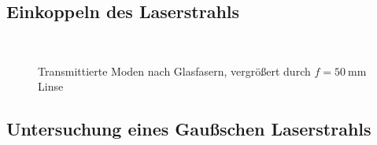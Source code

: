 \documentclass[11pt,a4paper,oneside]{scrartcl}
\begin{document}
\subsection{Einkoppeln des Laserstrahls}
\begin{figure}[H]
    \centering
  \\
   \caption{Transmittierte Moden nach Glasfasern, vergrößert durch $f=50\ \mathrm{mm}$ Linse}
    \label{FotostreckeGlasfasern}
\end{figure}
\subsection{Untersuchung eines Gaußschen Laserstrahls}
\end{document}
